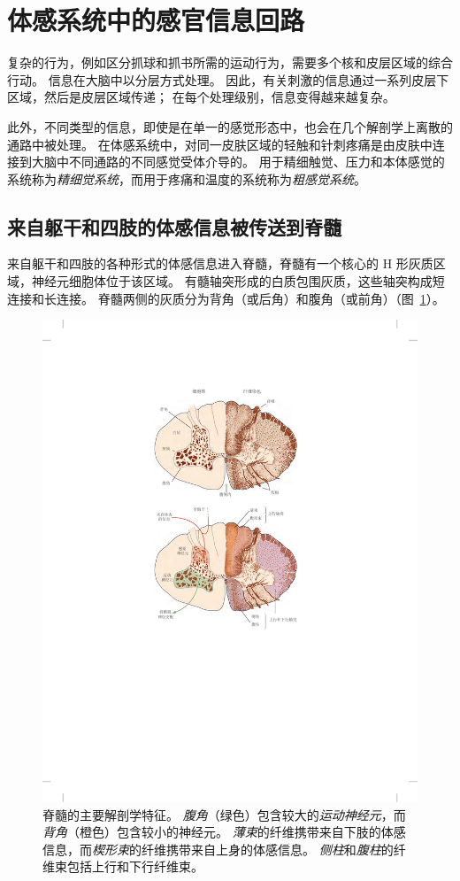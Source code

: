 \section{体感系统中的感官信息回路}

复杂的行为，例如区分抓球和抓书所需的运动行为，需要多个核和皮层区域的综合行动。
信息在大脑中以分层方式处理。
因此，有关刺激的信息通过一系列皮层下区域，然后是皮层区域传递； 
在每个处理级别，信息变得越来越复杂。


此外，不同类型的信息，即使是在单一的感觉形态中，也会在几个解剖学上离散的通路中被处理。 
在体感系统中，对同一皮肤区域的轻触和针刺疼痛是由皮肤中连接到大脑中不同通路的不同感觉受体介导的。 
用于精细触觉、压力和本体感觉的系统称为\textit{精细觉系统}，而用于疼痛和温度的系统称为\textit{粗感觉系统}。



\subsection{来自躯干和四肢的体感信息被传送到脊髓}

来自躯干和四肢的各种形式的体感信息进入脊髓，脊髓有一个核心的 H 形灰质区域，神经元细胞体位于该区域。 
有髓轴突形成的白质包围灰质，这些轴突构成短连接和长连接。
脊髓两侧的灰质分为背角（或后角）和腹角（或前角）（图~\ref{fig:4_3}）。


\begin{figure}[htbp]
	\centering
	\includegraphics[width=0.6\linewidth]{chap04/fig_4_3}
	\caption{脊髓的主要解剖学特征。 
		\textit{腹角}（绿色）包含较大的\textit{运动神经元}，而\textit{背角}（橙色）包含较小的神经元。
		\textit{薄束}的纤维携带来自下肢的体感信息，而\textit{楔形束}的纤维携带来自上身的体感信息。
		\textit{侧柱}和\textit{腹柱}的纤维束包括上行和下行纤维束。}
	\label{fig:4_3}
\end{figure}


